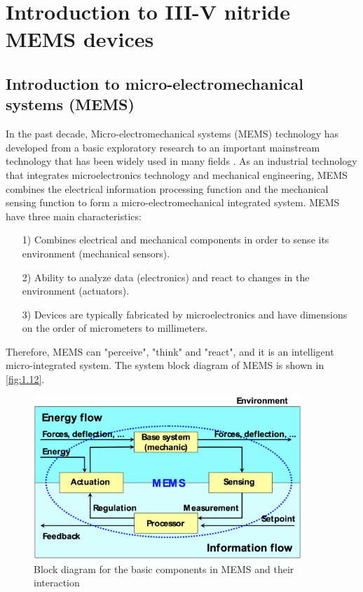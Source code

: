 \section{Introduction to III-V nitride MEMS devices}  %

\subsection{Introduction to micro-electromechanical systems (MEMS)}

In the past decade, Micro-electromechanical systems (MEMS)  technology has developed from a basic exploratory research to an important mainstream technology that has been widely used in many fields \cite{lyshevski2018nano,hsumems,gardner2003microsensors}. As an industrial technology that integrates microelectronics technology and mechanical engineering, MEMS combines the electrical information processing function and the mechanical sensing function to form a micro-electromechanical integrated system. MEMS have three main characteristics:

\begin{itemize}
	\item [1)] Combines electrical and mechanical components in order to sense its environment (mechanical sensors).
	\item [2)] Ability to analyze data (electronics) and react to changes in the environment (actuators).
	\item [3)] Devices are typically fabricated by microelectronics and have dimensions on the order of micrometers to millimeters.
\end{itemize}

Therefore, MEMS can "perceive", "think" and "react", and it is an intelligent micro-integrated system. The system block diagram of MEMS is shown in \autoref{fig:1.12}.

\begin{figure}[H] 
\centering    
\includegraphics[width=0.9\textwidth]{ch1_12}
\caption[Block diagram for the basic components in MEMS and their interaction]{Block diagram for the basic components in MEMS and their interaction \protect\cite{cimalla2010algan}}
\label{fig:1.12}
\end{figure}


